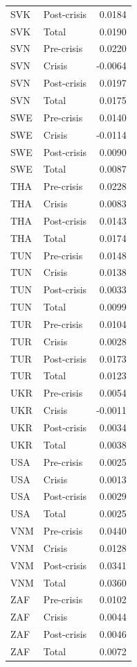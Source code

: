 \begin{longtable}[t]{llr}
SVK & Post-crisis & 0.0184\\
SVK & Total & 0.0190\\
SVN & Pre-crisis & 0.0220\\
\addlinespace
SVN & Crisis & -0.0064\\
SVN & Post-crisis & 0.0197\\
SVN & Total & 0.0175\\
SWE & Pre-crisis & 0.0140\\
SWE & Crisis & -0.0114\\
\addlinespace
SWE & Post-crisis & 0.0090\\
SWE & Total & 0.0087\\
THA & Pre-crisis & 0.0228\\
THA & Crisis & 0.0083\\
THA & Post-crisis & 0.0143\\
\addlinespace
THA & Total & 0.0174\\
TUN & Pre-crisis & 0.0148\\
TUN & Crisis & 0.0138\\
TUN & Post-crisis & 0.0033\\
TUN & Total & 0.0099\\
\addlinespace
TUR & Pre-crisis & 0.0104\\
TUR & Crisis & 0.0028\\
TUR & Post-crisis & 0.0173\\
TUR & Total & 0.0123\\
UKR & Pre-crisis & 0.0054\\
\addlinespace
UKR & Crisis & -0.0011\\
UKR & Post-crisis & 0.0034\\
UKR & Total & 0.0038\\
USA & Pre-crisis & 0.0025\\
USA & Crisis & 0.0013\\
\addlinespace
USA & Post-crisis & 0.0029\\
USA & Total & 0.0025\\
VNM & Pre-crisis & 0.0440\\
VNM & Crisis & 0.0128\\
VNM & Post-crisis & 0.0341\\
\addlinespace
VNM & Total & 0.0360\\
ZAF & Pre-crisis & 0.0102\\
ZAF & Crisis & 0.0044\\
ZAF & Post-crisis & 0.0046\\
ZAF & Total & 0.0072\\
\bottomrule
\end{longtable}
